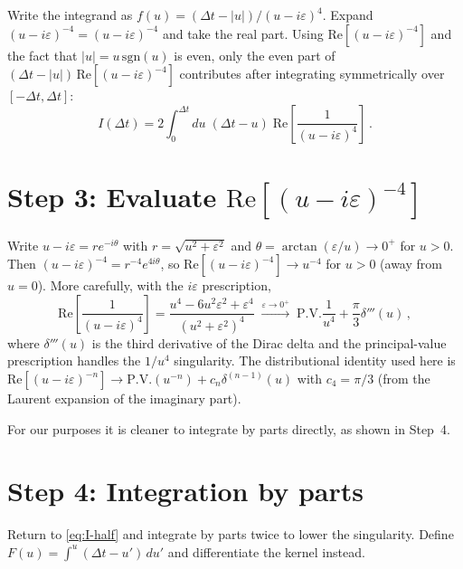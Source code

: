 \documentclass[12pt]{article}
\newcommand{\lb}{\left}
\newcommand{\rb}{\right}
\begin{document}
Write the integrand as $f(u) = (\Delta t - |u|)/(u-i\varepsilon)^{4}$.
Expand $(u-i\varepsilon)^{-4} = (u-i\varepsilon)^{-4}$ and take the real part.
Using $\mathrm{Re}[(u-i\varepsilon)^{-4}]$ and the fact that $|u| = u\,\mathrm{sgn}(u)$
is even, only the even part of $(\Delta t - |u|)\,\mathrm{Re}[(u-i\varepsilon)^{-4}]$
contributes after integrating symmetrically over $[-\Delta t, \Delta t]$:
%
\begin{equation}
  I(\Delta t)
  =
  2\int_{0}^{\Delta t}du\;(\Delta t - u)\;\mathrm{Re}\!\lb[\frac{1}{(u-i\varepsilon)^{4}}\rb] \,.
  \label{eq:I-half}
\end{equation}

\section*{Step 3: Evaluate $\mathrm{Re}[(u-i\varepsilon)^{-4}]$}

Write $u - i\varepsilon = r e^{-i\theta}$ with $r = \sqrt{u^{2}+\varepsilon^{2}}$ and
$\theta = \arctan(\varepsilon/u)\to 0^{+}$ for $u > 0$.
Then $(u-i\varepsilon)^{-4} = r^{-4}e^{4i\theta}$, so
$\mathrm{Re}[(u-i\varepsilon)^{-4}] \to u^{-4}$ for $u > 0$
(away from $u=0$).  More carefully, with the $i\varepsilon$ prescription,
%
\begin{equation}
  \mathrm{Re}\!\lb[\frac{1}{(u-i\varepsilon)^{4}}\rb]
  =
  \frac{u^{4} - 6u^{2}\varepsilon^{2} + \varepsilon^{4}}{(u^{2}+\varepsilon^{2})^{4}}
  \;\xrightarrow{\varepsilon\to 0^{+}}\;
  \mathrm{P.V.}\frac{1}{u^{4}} + \frac{\pi}{3}\delta'''(u) \,,
\end{equation}
%
where $\delta'''(u)$ is the third derivative of the Dirac delta and the
principal-value prescription handles the $1/u^{4}$ singularity.
The distributional identity used here is
$\mathrm{Re}[(u-i\varepsilon)^{-n}] \to \mathrm{P.V.}(u^{-n}) +
c_{n}\delta^{(n-1)}(u)$ with $c_4 = \pi/3$ (from the Laurent expansion of the
imaginary part).

For our purposes it is cleaner to integrate by parts directly, as shown in Step~4.

\section*{Step 4: Integration by parts}

Return to \eqref{eq:I-half} and integrate by parts twice to lower the singularity.
Define $F(u) = \int^{u}(\Delta t - u')\,du'$ and differentiate the kernel instead.
\end{document}
